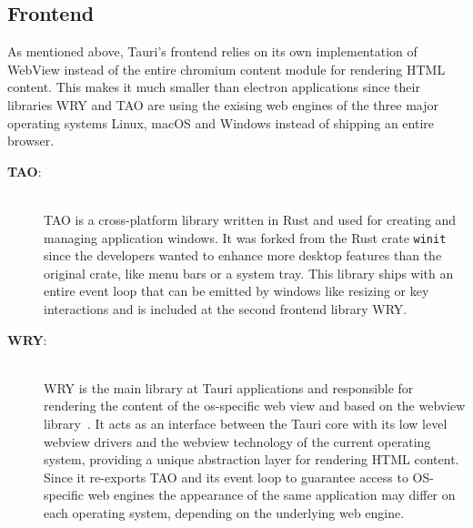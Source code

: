\subsection{Frontend}
\label{subsec:tauri:frontend}
As mentioned above, Tauri's frontend relies on its own implementation of WebView instead of the entire chromium content module for rendering \ac{HTML} content.
This makes it much smaller than electron applications since their libraries WRY and TAO are using the exising web engines of the three major operating systems Linux, macOS and Windows instead of shipping an entire browser.
\begin{description}
    \item[\textbf{TAO}:] \hfill \\
    TAO is a cross-platform library written in Rust and used for creating and managing application windows.
    It was forked from the Rust crate \texttt{winit} since the developers wanted to enhance more desktop features than the original crate, like menu bars or a system tray.
    This library ships with an entire event loop that can be emitted by windows like resizing or key interactions and is included at the second frontend library WRY\@.
    \item[\textbf{WRY}:] \hfill \\
    WRY is the main library at Tauri applications and responsible for rendering the content of the os-specific web view and based on the webview library~\cite{githubWebview}.
    It acts as an interface between the Tauri core with its low level webview drivers and the webview technology of the current operating system, providing a unique abstraction layer for rendering \ac{HTML} content.
    Since it re-exports TAO and its event loop to guarantee access to \ac{OS}-specific web engines the appearance of the same application may differ on each operating system, depending on the underlying web engine.
\end{description}
